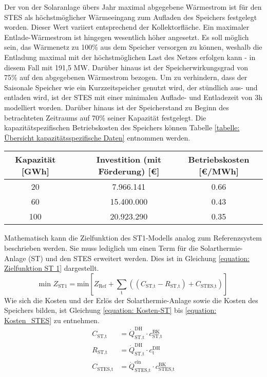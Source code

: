 Der von der Solaranlage übers Jahr maximal abgegebene Wärmestrom ist für den \ac{STES} als höchstmöglicher Wärmeeingang zum Aufladen des Speichers festgelegt worden. Dieser Wert variiert entsprechend der Kollektorfläche. Ein maximaler Entlade-Wärmestrom ist hingegen wesentlich höher angesetzt. Es soll möglich sein, das Wärmenetz zu 100\% aus dem Speicher versorgen zu können, weshalb die Entladung maximal mit der höchstmöglichen Last des Netzes erfolgen kann - in diesem Fall mit 191,5 MW. Darüber hinaus ist der Speicherwirkungsgrad von 75\% auf den abgegebenen Wärmestrom bezogen. Um zu verhindern, dass der Saisonale Speicher wie ein Kurzzeitspeicher genutzt wird, der stündlich aus- und entladen wird, ist der \ac{STES} mit einer minimalen Auflade- und Entladezeit von 3h modelliert worden. Darüber hinaus ist der Speicherstand zu Beginn des betrachteten Zeitraums auf 70\% seiner Kapazität festgelegt. Die kapazitätspezifischen Betriebskosten des Speichers können Tabelle \ref{tabelle: Übersicht kapazitätsspezifische Daten} entnommen werden.
	\begin{center}
		\label{tabelle: Übersicht kapazitätsspezifische Daten}
		\begin{tabular}{ccccc}
			\hline 
			Kapazität [GWh] &  &  & Investition (mit Förderung) [\euro]  & Betriebskosten [\euro/MWh] \tabularnewline
			\hline 
			20 &  &  & 7.966.141 & 0.66 \tabularnewline
			60 &  &  & 15.400.000 & 0.43 \tabularnewline
			100 &  &  & 20.923.290 & 0.35 \tabularnewline		
			\hline
		\end{tabular}
	\end{center}

Mathematisch kann die Zielfunktion des ST1-Modells analog zum Referenzsystem beschrieben werden. Sie muss lediglich um einen Term für die Solarthermie-Anlage (ST) und den \ac{STES} erweitert werden. Dies ist in Gleichung \ref{equation: Zielfunktion ST 1} dargestellt.
\begin{equation}
	\label{equation: Zielfunktion ST 1}
	\text{min } Z_{\text{ST1}} = \text{min} \left[Z_{\text{Ref}} +  \sum_{\text{t}}^{} \left((C_{\text{ST,t}} - R_{\text{ST,t}}) + C_{\text{STES,t}} \right)   \right]
\end{equation}
Wie sich die Kosten und der Erlös der Solarthermie-Anlage sowie die Kosten des Speichers bilden, ist Gleichung \ref{equation: Kosten-ST} bis \ref{equation: Kosten_STES} zu entnehmen.
\begin{align}
	\label{equation: Kosten-ST}
	C_{\text{ST,t}} &= \dot{Q}_{\text{ST,t}}^{\text{DH}} \cdot c_{\text{ST,t}}^{\text{BK}} \\
	R_{\text{ST,t}} &= \dot{Q}_{\text{ST,t}}^{\text{DH}} \cdot c_{\text{t}}^{\text{DH}}\\
	\label{equation: Kosten_STES}
	C_{\text{STES,t}} &= \dot{Q}_{\text{STES,t}}^{\text{ein}} \cdot c_{\text{STES,t}}^{\text{BK}}
\end{align}


